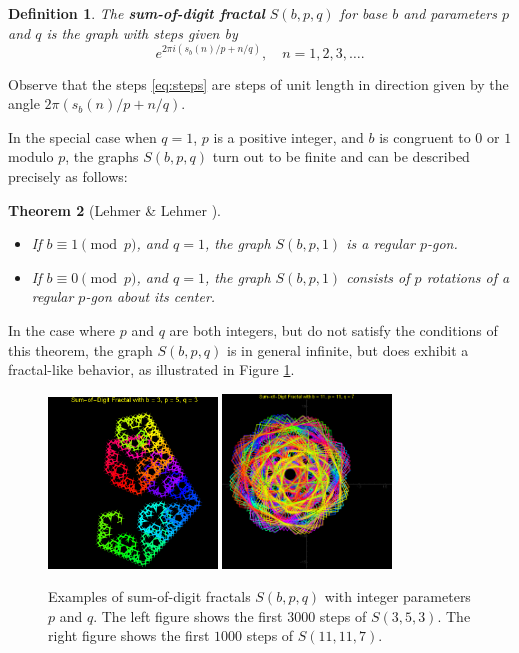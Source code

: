 \documentclass[11pt,leqno]{article}
\newtheorem{defn}{Definition}[section]
\newtheorem{thm}[defn]{Theorem}
\begin{document}
\begin{defn}
The \textbf{sum-of-digit fractal} $S(b,p,q)$ for base $b$
and parameters $p$ and $q$ is the graph with steps given by 
\begin{equation}
\label{eq:steps}
e ^ {2 \pi i (s_b(n)/p + n/q)},
\quad n=1,2,3,\dots. 
\end{equation}
\end{defn}
Observe that the steps \eqref{eq:steps} are steps of unit length in 
direction given by the angle $2 \pi  (s_b(n)/p + n/q)$.


In the special case when $q=1$, $p$ is a positive integer, and $b$ is
congruent to $0$ or $1$ modulo $p$, the graphs $S(b,p,q)$
turn out to be finite and can be described precisely as follows:

\begin{thm}[Lehmer \& Lehmer \cite{lehmer-lehmer1979}]
\mbox{}
\begin{itemize}
\item If $b \equiv 1 \pmod{p}$, and $q = 1$, the graph $S(b,p,1)$ 
is a regular $p$-gon.
\item If $b \equiv 0 \pmod{p}$, and $q = 1$, the graph $S(b,p,1)$ 
consists of $p$ rotations of a regular $p$-gon about its center.
\end{itemize}
\end{thm}

In the case where $p$ and $q$ are both integers, but do not satisfy the
conditions of this theorem, the graph $S(b,p,q)$ is in general infinite,
but does exhibit a fractal-like behavior, as illustrated in  Figure
\ref{fig:sum-of-digit-fractal-integer-case}.
\begin{figure}[H]
\label{fig:sum-of-digit-fractal-integer-case}
\centering
\includegraphics[width=0.4\textwidth]
{n3000v2.png}
\hspace{1em}
\includegraphics[width=0.4\textwidth]
{n(1000)_b(11)_p(11)_q(7).png}
\caption{Examples of sum-of-digit fractals $S(b,p,q)$ with 
integer parameters $p$ and $q$. The left figure shows the 
first $3000$ steps of $S(3,5,3)$. 
The right figure shows the 
first $1000$ steps of $S(11,11,7)$. 
}
\end{figure}
\end{document}
